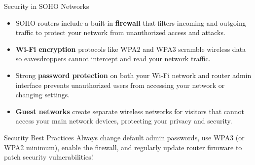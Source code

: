 \documentclass[aspectratio=169]{beamer}
\begin{document}
\begin{frame}{Security in SOHO Networks}

\begin{itemize}
    \item SOHO routers include a built-in \textbf{firewall} that filters incoming and outgoing traffic to protect your network from unauthorized access and attacks.
    \item \textbf{Wi-Fi encryption} protocols like WPA2 and WPA3 scramble wireless data so eavesdroppers cannot intercept and read your network traffic.
    \item Strong \textbf{password protection} on both your Wi-Fi network and router admin interface prevents unauthorized users from accessing your network or changing settings.
    \item \textbf{Guest networks} create separate wireless networks for visitors that cannot access your main network devices, protecting your privacy and security.
\end{itemize}

\vspace{0.3cm}

\begin{alertblock}{Security Best Practices}
Always change default admin passwords, use WPA3 (or WPA2 minimum), enable the firewall, and regularly update router firmware to patch security vulnerabilities!
\end{alertblock}

\end{frame}
\end{document}
